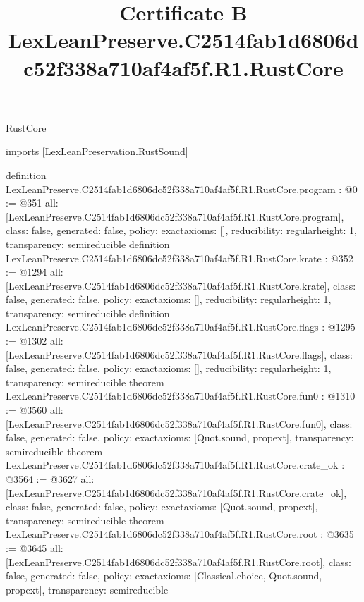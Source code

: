 \begin{lexlean}{RustCore}
\title{Certificate B LexLeanPreserve.C2514fab1d6806dc52f338a710af4af5f.R1.RustCore}
\begin{coremodule}
imports [LexLeanPreservation.RustSound]

definition LexLeanPreserve.C2514fab1d6806dc52f338a710af4af5f.R1.RustCore.program : @0 := @351 {
  all: [LexLeanPreserve.C2514fab1d6806dc52f338a710af4af5f.R1.RustCore.program],
  class: false,
  generated: false,
  policy: exact{axioms: []},
  reducibility: regular{height: 1},
  transparency: semireducible
}
definition LexLeanPreserve.C2514fab1d6806dc52f338a710af4af5f.R1.RustCore.krate : @352 := @1294 {
  all: [LexLeanPreserve.C2514fab1d6806dc52f338a710af4af5f.R1.RustCore.krate],
  class: false,
  generated: false,
  policy: exact{axioms: []},
  reducibility: regular{height: 1},
  transparency: semireducible
}
definition LexLeanPreserve.C2514fab1d6806dc52f338a710af4af5f.R1.RustCore.flags : @1295 := @1302 {
  all: [LexLeanPreserve.C2514fab1d6806dc52f338a710af4af5f.R1.RustCore.flags],
  class: false,
  generated: false,
  policy: exact{axioms: []},
  reducibility: regular{height: 1},
  transparency: semireducible
}
theorem LexLeanPreserve.C2514fab1d6806dc52f338a710af4af5f.R1.RustCore.fun0 : @1310 := @3560 {
  all: [LexLeanPreserve.C2514fab1d6806dc52f338a710af4af5f.R1.RustCore.fun0],
  class: false,
  generated: false,
  policy: exact{axioms: [Quot.sound, propext]},
  transparency: semireducible
}
theorem LexLeanPreserve.C2514fab1d6806dc52f338a710af4af5f.R1.RustCore.crate_ok : @3564 := @3627 {
  all: [LexLeanPreserve.C2514fab1d6806dc52f338a710af4af5f.R1.RustCore.crate_ok],
  class: false,
  generated: false,
  policy: exact{axioms: [Quot.sound, propext]},
  transparency: semireducible
}
theorem LexLeanPreserve.C2514fab1d6806dc52f338a710af4af5f.R1.RustCore.root : @3635 := @3645 {
  all: [LexLeanPreserve.C2514fab1d6806dc52f338a710af4af5f.R1.RustCore.root],
  class: false,
  generated: false,
  policy: exact{axioms: [Classical.choice, Quot.sound, propext]},
  transparency: semireducible
}


\end{coremodule}
\end{lexlean}
